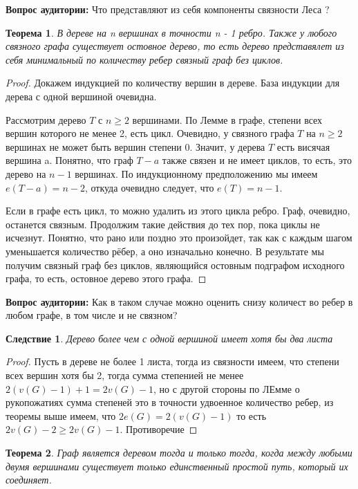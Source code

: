 \documentclass{article}
\renewcommand{\ge}{\geqslant}
\newtheorem{theorem}{Теорема}
\newtheorem{consequence}{Следствие}
\theoremstyle{definition}
\newcommand{\question}{\textbf{Вопрос аудитории: }}
\theoremstyle{remark}
\begin{document}
\question Что представляют из себя компоненты связности Леса ?

\begin{theorem}
    В дереве на n вершинах в точности n - 1 ребро. Также у любого связного графа существует \textit{остовное дерево}, то есть дерево представялет из себя минимальный по количеству ребер связный граф без циклов. 
\end{theorem}

\begin{proof}
Докажем индукцией по количеству вершин в дереве. База индукции для дерева с одной вершиной очевидна. 

Рассмотрим дерево $T$ с $n \ge 2$ вершинами. По Лемме  в графе, степени всех вершин которого не менее 2, есть цикл. Очевидно, у связного графа $T$
на $n \ge 2$ вершинах не может быть вершин степени 0. Значит, у дерева $T$
есть висячая вершина a. Понятно, что граф $T - a$ также связен и не
имеет циклов, то есть, это дерево на $n - 1$ вершинах. По индукционному
предположению мы имеем $e(T - a) = n - 2$, откуда очевидно следует,
что $e(T) = n - 1$.

 Если в графе есть цикл, то можно удалить из этого цикла ребро.
Граф, очевидно, останется связным. Продолжим такие действия до тех
пор, пока циклы не исчезнут. Понятно, что рано или поздно это произойдет, так как с каждым шагом уменьшается количество рёбер, а оно
изначально конечно. В результате мы получим связный граф без циклов,
являющийся остовным подграфом исходного графа, то есть, остовное дерево этого графа.
\end{proof}

 \question Как в таком случае можно оценить снизу количест во ребер в любом графе, в том числе и не связном?

\begin{consequence}
    Дерево более чем с одной вершиной имеет хотя бы два листа
\end{consequence}
 \begin{proof}
    Пусть в дереве не более 1 листа, тогда из связности имеем, что степени всех вершин хотя бы 2, тогда сумма степенией не менее $2(v(G) - 1) + 1 = 2v(G) - 1$, но с другой стороны по ЛЕмме о рукопожатиях сумма степеней это в точности удвоенное количество ребер, из теоремы выше имеем, что $2e(G) = 2(v(G) - 1)$ то есть $2v(G) - 2 \ge 2v(G)  - 1$. Противоречие
 \end{proof}

\begin{theorem}
    Граф является деревом тогда и только тогда, когда между любыми двумя вершинами существует только единственный простой путь, который их соединяет.
\end{theorem}
\end{document}
